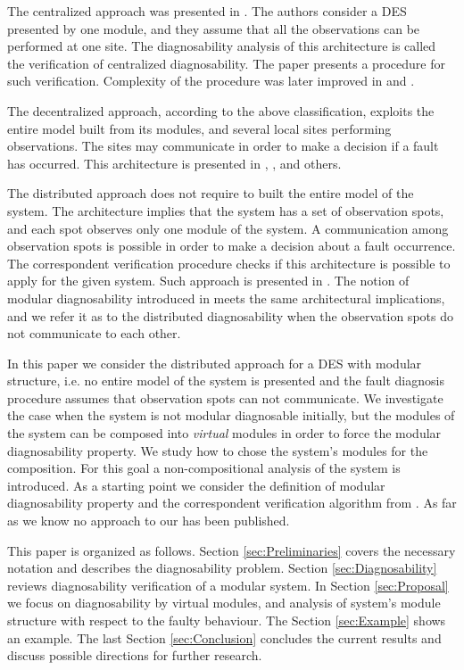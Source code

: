 \documentclass[a4paper, 10pt, conference]{ieeeconf}
\begin{document}
The centralized approach was presented in \cite{sampath_diagnosability_1995}.
The authors consider a DES presented by one module, and they assume that all the
observations can be performed at one site. The diagnosability analysis of this
architecture is called the verification of centralized diagnosability. The paper
presents a procedure for such verification. Complexity of the procedure was
later improved in \cite{jiang_polynomial_2001} and
\cite{yoo_polynomial-time_2002}.

The decentralized approach, according to the above classification, exploits the
entire model built from its modules, and several local sites performing
observations. The sites may communicate in order to make a decision if a fault
has occurred. This architecture is presented in \cite{debouk_coordinated_1998},
\cite{qiu_decentralized_2006}, \cite{wang_diagnosis_2007} and others.

The distributed approach does not require to built the entire model of the
system. The architecture implies that the system has a set of observation spots,
and each spot observes only one module of the system. A communication among
observation spots is possible in order to make a decision about a fault
occurrence. The correspondent verification procedure checks if this architecture
is possible to apply for the given system. Such approach is presented in
\cite{su_distributed_2002}. The notion of modular diagnosability introduced in
\cite{contant_diagnosability_2006} meets the same architectural implications,
and we refer it as to the distributed diagnosability when the observation spots
do not communicate to each other.

In this paper we consider the distributed approach for a DES with modular
structure, i.e. no entire model of the system is presented and the fault
diagnosis procedure assumes that observation spots can not communicate. We
investigate the case when the system is not modular diagnosable initially, but
the modules of the system can be composed into \emph{virtual} modules in order
to force the modular diagnosability property. We study how to chose the system's
modules for the composition. For this goal a non-compositional analysis of the
system is introduced.
As a starting point we consider the definition of modular diagnosability
property and the correspondent verification algorithm from
\cite{contant_diagnosability_2006}. As far as we know no approach to our has
been published.

This paper is organized as follows. Section \ref{sec:Preliminaries} covers the
necessary notation and describes the diagnosability problem. Section
\ref{sec:Diagnosability} reviews diagnosability verification of a modular
system. In Section \ref{sec:Proposal} we focus on diagnosability by virtual
modules, and analysis of system's module structure with respect to the faulty
behaviour. The Section \ref{sec:Example} shows an example. The last Section
\ref{sec:Conclusion} concludes the current results and discuss possible
directions for further research.
\end{document}
